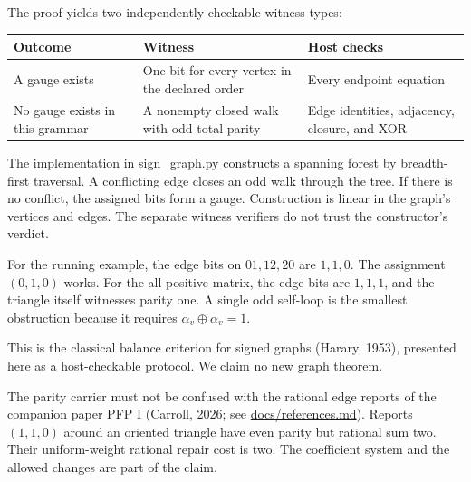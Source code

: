 \documentclass[
  11pt,
]{article}
\begin{document}
The proof yields two independently checkable witness types:

\begin{longtable}[]{@{}
  >{\raggedright\arraybackslash}p{}
  >{\raggedright\arraybackslash}p{}
  >{\raggedright\arraybackslash}p{}@{}}
\toprule\noalign{}
\begin{minipage}[b]{\linewidth}\raggedright
Outcome
\end{minipage} & \begin{minipage}[b]{\linewidth}\raggedright
Witness
\end{minipage} & \begin{minipage}[b]{\linewidth}\raggedright
Host checks
\end{minipage} \\
\midrule\noalign{}
\endhead
\bottomrule\noalign{}
\endlastfoot
A gauge exists & One bit for every vertex in the declared order & Every
endpoint equation \\
No gauge exists in this grammar & A nonempty closed walk with odd total
parity & Edge identities, adjacency, closure, and XOR \\
\end{longtable}

The implementation in
\href{https://github.com/dbccpage/the_symbol_game/blob/c819bec432446dd3c9b1edf1583384cfe76c6c71/omega_engine_atlas/coda_atlas/omega_engine_symbol_game/002_pfp_signed_presentations_and_search_frontier/code/genesis_alpha/sign_graph.py}{sign\_graph.py}
constructs a spanning forest by breadth-first traversal. A conflicting
edge closes an odd walk through the tree. If there is no conflict, the
assigned bits form a gauge. Construction is linear in the graph's
vertices and edges. The separate witness verifiers do not trust the
constructor's verdict.

For the running example, the edge bits on \(01,12,20\) are \(1,1,0\).
The assignment \((0,1,0)\) works. For the all-positive matrix, the edge
bits are \(1,1,1\), and the triangle itself witnesses parity one. A
single odd self-loop is the smallest obstruction because it requires
\(\alpha_v\oplus\alpha_v=1\).

This is the classical balance criterion for signed graphs (Harary,
1953), presented here as a host-checkable protocol. We claim no new
graph theorem.

The parity carrier must not be confused with the rational edge reports
of the companion paper PFP I (Carroll, 2026; see
\href{https://github.com/dbccpage/the_symbol_game/blob/c819bec432446dd3c9b1edf1583384cfe76c6c71/omega_engine_atlas/coda_atlas/omega_engine_symbol_game/002_pfp_signed_presentations_and_search_frontier/docs/references.md}{docs/references.md}).
Reports \((1,1,0)\) around an oriented triangle have even parity but
rational sum two. Their uniform-weight rational repair cost is two. The
coefficient system and the allowed changes are part of the claim.
\end{document}

